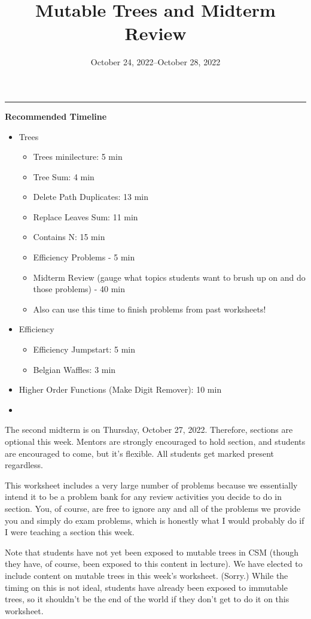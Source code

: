 \documentclass{exam}
\title{Mutable Trees and Midterm Review}
\date{October 24, 2022--October 28, 2022}
\begin{document}
\maketitle
\rule{\textwidth}{0.15em}
\fontsize{12}{15}\selectfont

\begin{meta}
    \textbf{Recommended Timeline}
    \begin{itemize}
        \item Trees
        \begin{itemize}
            \item Trees minilecture: 5 min
            \item Tree Sum: 4 min
            \item Delete Path Duplicates: 13 min
            \item Replace Leaves Sum: 11 min
            \item Contains N: 15 min
            \item Efficiency Problems - 5 min
            \item Midterm Review (gauge what topics students want to brush up on and do those problems) - 40 min
            \item Also can use this time to finish problems from past worksheets!
        \end{itemize}
        \item Efficiency
        \begin{itemize}
            \item Efficiency Jumpstart: 5 min
            \item Belgian Waffles: 3 min
        \end{itemize}
        \item Higher Order Functions (Make Digit Remover): 10 min
        \item 
    \end{itemize}

    The second midterm is on Thursday, October 27, 2022. Therefore, sections are optional this week. Mentors are strongly encouraged to hold section, and students are encouraged to come, but it's flexible. All students get marked present regardless. 
    
    This worksheet includes a very large number of problems because we essentially intend it to be a problem bank for any review activities you decide to do in section. You, of course, are free to ignore any and all of the problems we provide you and simply do exam problems, which is honestly what I would probably do if I were teaching a section this week. 

    Note that students have not yet been exposed to mutable trees in CSM (though they have, of course, been exposed to this content in lecture). We have elected to include content on mutable trees in this week's worksheet. (Sorry.) While the timing on this is not ideal, students have already been exposed to immutable trees, so it shouldn't be the end of the world if they don't get to do it on this worksheet. 
\end{meta}
\end{document}
